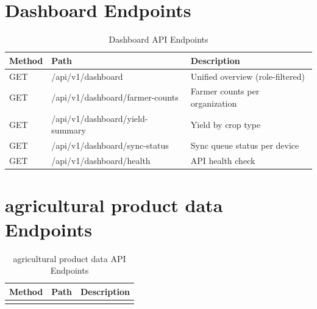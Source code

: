 \documentclass[12pt,a4paper,oneside]{report}
\begin{document}
\begin{appendix}
\section{Dashboard Endpoints}
\begin{longtable}{lll}
\caption{Dashboard API Endpoints} \\

\textbf{Method} & \textbf{Path} & \textbf{Description} \\

\endhead

\endfoot

\endlastfoot
GET & /api/v1/dashboard & Unified overview (role-filtered) \\
GET & /api/v1/dashboard/farmer-counts & Farmer counts per organization \\
GET & /api/v1/dashboard/yield-summary & Yield by crop type \\
GET & /api/v1/dashboard/sync-status & Sync queue status per device \\
GET & /api/v1/dashboard/health & API health check \\
\end{longtable}

\section{agricultural product data Endpoints}
\begin{longtable}{lll}
\caption{agricultural product data API Endpoints} \\

\textbf{Method} & \textbf{Path} & \textbf{Description} \\

\endhead

\endfoot


\end{longtable}
\end{appendix}
\end{document}
